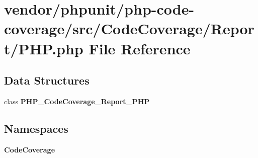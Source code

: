 \section{vendor/phpunit/php-\/code-\/coverage/src/\+Code\+Coverage/\+Report/\+P\+H\+P.php File Reference}
\label{php-code-coverage_2src_2_code_coverage_2_report_2_p_h_p_8php}
\subsection*{Data Structures}
\begin{DoxyCompactItemize}
\item 
class {\bf P\+H\+P\+\_\+\+Code\+Coverage\+\_\+\+Report\+\_\+\+P\+H\+P}
\end{DoxyCompactItemize}
\subsection*{Namespaces}
\begin{DoxyCompactItemize}
\item 
 {\bf Code\+Coverage}
\end{DoxyCompactItemize}
